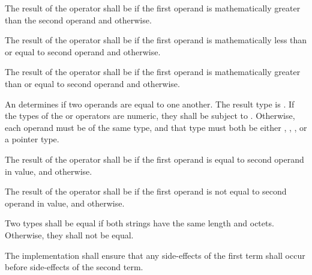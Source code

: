 \specsubsubitem
The result of the \terminal{>} operator shall be  if the first
operand is mathematically greater than the second operand and 
otherwise.

\specsubsubitem
The result of the \terminal{<=} operator shall be  if the
first operand is mathematically less than or equal to second operand
and  otherwise.

\specsubsubitem
The result of the \terminal{>=} operator shall be  if the first
operand is mathematically greater than or equal to second operand
and  otherwise.

\specsubsubitem
An  determines if two operands are equal to one
another. The result type is . If the types of the \terminal{==}
or \terminal{!=} operators are numeric, they shall be subject to
. Otherwise, each operand must be of the same type, and
that type must both be either , , ,
or a pointer type.

\specsubsubitem
The result of the \terminal{==} operator shall be  if the first
operand is equal to second operand in value, and  otherwise.

\specsubsubitem
The result of the \terminal{!=} operator shall be  if the first
operand is not equal to second operand in value, and  otherwise.

\specsubsubitem
Two  types shall be equal if both strings have the same length and
octets. Otherwise, they shall not be equal.

\specsubsubitem
The implementation shall ensure that any side-effects of the first term shall
occur before side-effects of the second term.


\begin{grammar}
 \\
	 \\
	 \terminal{\&\&}  \\

 \\
	 \\
	 \terminal{\textasciicircum\textasciicircum}  \\

 \\
	 \\
	 \terminal{||}  \\
\end{grammar}


